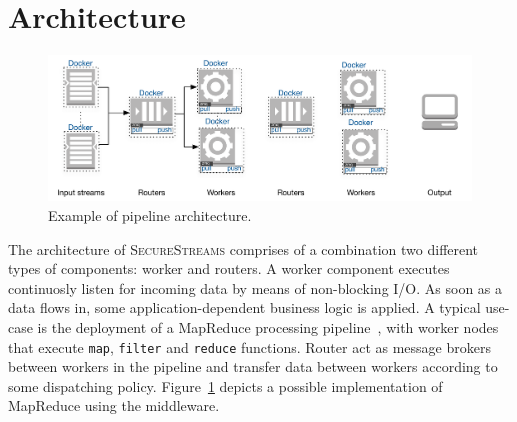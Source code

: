 \section{Architecture}
\label{sec:architecture}
\begin{figure}[!t]
  \centering
  \includegraphics[scale=0.7]{images/architecture_pipeline}
  \caption{Example of \SYS pipeline architecture.}
  \label{fig:architecture_pipeline}
\end{figure}


The architecture of \textsc{SecureStreams} comprises of a combination two different types of components: worker and routers.
A worker component executes continuosly listen for incoming data by means of non-blocking I/O.
As soon as a data flows in, some application-dependent business logic is applied.
A typical use-case is the deployment of a MapReduce processing pipeline~\cite{Dean:2008:MSD:1327452.1327492}, with worker nodes that execute \texttt{map}, \texttt{filter} and \texttt{reduce} functions.
Router act as message brokers between workers in the pipeline and transfer data between workers according to some dispatching policy.
Figure~\ref{fig:architecture_pipeline} depicts a possible implementation of MapReduce using the \SYS middleware.

